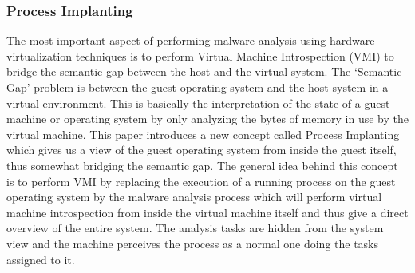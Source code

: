 \documentclass[11pt]{article}
\begin{document}
	\subsubsection{Process Implanting}
	The most important aspect of performing malware analysis using hardware virtualization techniques is to perform Virtual Machine Introspection (VMI) to bridge the semantic gap between the host and the virtual system. The ‘Semantic Gap’ problem is between the guest operating system and the host system in a virtual environment. This is basically the interpretation of the state of a guest machine or operating system by only analyzing the bytes of memory in use by the virtual machine. This paper introduces a new concept called Process Implanting which gives us a view of the guest operating system from inside the guest itself, thus somewhat bridging the semantic gap. The general idea behind this concept is to perform VMI by replacing the execution of a running process on the guest operating system by the malware analysis process which will perform virtual machine introspection from inside the virtual machine itself and thus give a direct overview of the entire system. The analysis tasks are hidden from the system view and the machine perceives the process as a normal one doing the tasks assigned to it.
\end{document}
